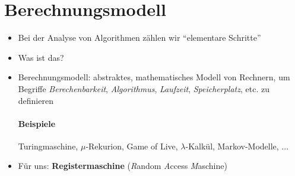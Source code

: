 \section{Berechnungsmodell}
\begin{itemize}
 \item Bei der Analyse von Algorithmen zählen wir "`elementare Schritte"'
 \item Was ist das?
 \item Berechnungsmodell: abstraktes, mathematisches Modell von Rechnern, um Begriffe \emph{Berechenbarkeit}, \emph{Algorithmus}, \emph{Laufzeit}, \emph{Speicherplatz}, etc. zu definieren
      \paragraph*{Beispiele} Turingmaschine, $\mu$-Rekurion, Game of Live, $\lambda$-Kalkül, Markov-Modelle, ...
 \item Für uns: \textbf{Registermaschine} (\emph{R}andom \emph{A}ccess \emph{M}aschine)
\end{itemize}
